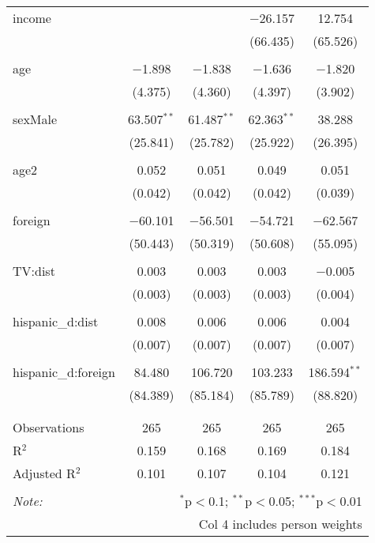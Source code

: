 \begin{table}[!htbp]
\begin{tabular}{@{\extracolsep{-5pt}}lcccc}
 income &  &  & $-$26.157 & 12.754 \\ 
  &  &  & (66.435) & (65.526) \\ 
  & & & & \\ 
 age & $-$1.898 & $-$1.838 & $-$1.636 & $-$1.820 \\ 
  & (4.375) & (4.360) & (4.397) & (3.902) \\ 
  & & & & \\ 
 sexMale & 63.507$^{**}$ & 61.487$^{**}$ & 62.363$^{**}$ & 38.288 \\ 
  & (25.841) & (25.782) & (25.922) & (26.395) \\ 
  & & & & \\ 
 age2 & 0.052 & 0.051 & 0.049 & 0.051 \\ 
  & (0.042) & (0.042) & (0.042) & (0.039) \\ 
  & & & & \\ 
 foreign & $-$60.101 & $-$56.501 & $-$54.721 & $-$62.567 \\ 
  & (50.443) & (50.319) & (50.608) & (55.095) \\ 
  & & & & \\ 
 TV:dist & 0.003 & 0.003 & 0.003 & $-$0.005 \\ 
  & (0.003) & (0.003) & (0.003) & (0.004) \\ 
  & & & & \\ 
 hispanic\_d:dist & 0.008 & 0.006 & 0.006 & 0.004 \\ 
  & (0.007) & (0.007) & (0.007) & (0.007) \\ 
  & & & & \\ 
 hispanic\_d:foreign & 84.480 & 106.720 & 103.233 & 186.594$^{**}$ \\ 
  & (84.389) & (85.184) & (85.789) & (88.820) \\ 
  & & & & \\ 
\hline \\[-1.8ex] 
Observations & 265 & 265 & 265 & 265 \\ 
R$^{2}$ & 0.159 & 0.168 & 0.169 & 0.184 \\ 
Adjusted R$^{2}$ & 0.101 & 0.107 & 0.104 & 0.121 \\ 
\hline 
\hline \\[-1.8ex] 
\textit{Note:}  & \multicolumn{4}{r}{$^{*}$p$<$0.1; $^{**}$p$<$0.05; $^{***}$p$<$0.01} \\ 
 & \multicolumn{4}{r}{Col 4 includes person weights} \\ 
\end{tabular} 
\end{table} 
